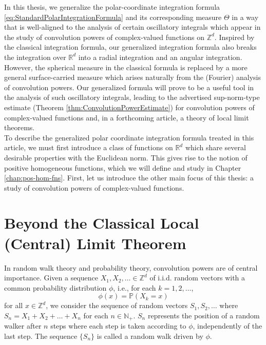 \documentclass[11pt, letter]{book}
\begin{document}
\noindent In this thesis, we generalize the polar-coordinate integration formula \eqref{eq:StandardPolarIntegrationFormula} and its corresponding measure $\Theta$ in a way that is well-aligned to the analysis of certain oscillatory integrals which appear in the study of convolution powers of complex-valued functions on $\mathbb{Z}^d$. Inspired by the classical integration formula, our generalized integration formula also breaks the integration over $\mathbb{R}^d$ into a radial integration and an angular integration. However, the spherical measure in the classical formula is replaced by a more general surface-carried measure which arises naturally from the (Fourier) analysis of convolution powers. Our generalized formula will prove to be a useful tool in the analysis of such oscillatory integrals, leading to the advertised sup-norm-type estimate (Theorem \ref{thm:ConvolutionPowerEstimate}) for convolution powers of complex-valued functions and, in a forthcoming article, a theory of local limit theorems.\\ 

\noindent To describe the generalized polar coordinate integration formula treated in this article, we must first introduce a class of functions on $\mathbb{R}^d$ which share several desirable properties with the Euclidean norm. This gives rise to the notion of positive homogeneous functions, which we will define and study in Chapter \ref{chap:pos-hom-fns}. First, let us introduce the other main focus of this thesis: a study of convolution powers of complex-valued functions.








\section{Beyond the Classical Local (Central) Limit Theorem}




\noindent In random walk theory and probability theory, convolution powers are of central importance. Given a sequence $X_1, X_2, \dots \in \mathbb{Z}^d$ of i.i.d. random vectors with a common probability distribution $\phi$, i.e., for each $k=1,2,\dots$,
\begin{equation*}
    \phi(x)=\mathbb{P}(X_k=x)
\end{equation*}
for all $x\in\mathbb{Z}^d$, we consider the sequence of random vectors $S_1,S_2,\dots$ where $S_n=X_1+X_2 +\dots+X_n$ for each $n\in\mathbb{N}_+$. $S_n$ represents the position of a random walker after $n$ steps where each step is taken according to $\phi$, independently of the last step. The sequence $\{S_n\}$ is called a random walk driven by $\phi$.\\
\end{document}
